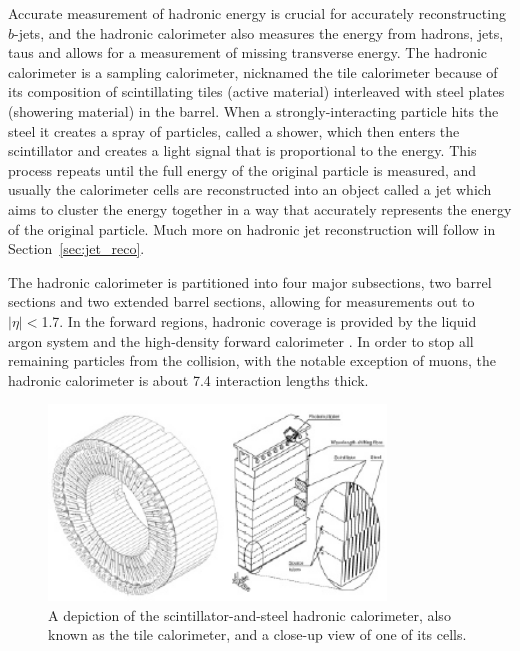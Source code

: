 Accurate measurement of hadronic energy is crucial for accurately reconstructing $b$-jets, and the hadronic calorimeter also measures the 
energy from hadrons, jets, taus and allows for a measurement of missing transverse energy.  The hadronic calorimeter 
is a sampling calorimeter, nicknamed the tile calorimeter because of its composition of scintillating tiles (active material) 
interleaved with steel plates (showering material) in the barrel.  When a strongly-interacting particle hits the steel it creates a 
spray of particles, called a shower, which then enters the scintillator and creates a light signal that is 
proportional to the energy.  This process repeats until the full energy of the original particle is measured, and 
usually the calorimeter cells are reconstructed into an object called a jet which aims to cluster the energy together in 
a way that accurately represents the energy of the original particle.  Much more on hadronic jet reconstruction will follow in Section~\ref{sec:jet_reco}.

The hadronic calorimeter is partitioned into four major subsections, two barrel sections and two extended barrel sections, allowing 
for measurements out to $|\eta|<$1.7.  In the forward regions, hadronic coverage is provided 
by the liquid argon system and the high-density forward calorimeter \cite{cal_tdr}. 
In order to stop all remaining particles from the collision, 
with the notable exception of muons, the hadronic calorimeter is about 7.4 interaction lengths thick.

\begin{figure}
	\includegraphics[width=0.8\textwidth]{ATLASDetector/images/tile_cal.pdf}
	\caption{A depiction of the scintillator-and-steel hadronic calorimeter, also known as the tile calorimeter, and a close-up view of one of its cells.	\label{fig:tile_cal}}
\end{figure}




